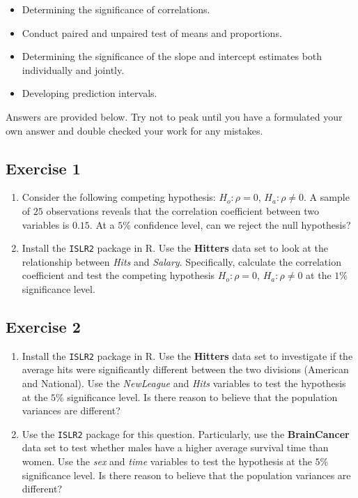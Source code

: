 \documentclass[
  letterpaper,
  DIV=11,
  numbers=noendperiod]{scrreprt}
\begin{document}
\begin{itemize}
\item
  Determining the significance of correlations.
\item
  Conduct paired and unpaired test of means and proportions.
\item
  Determining the significance of the slope and intercept estimates both
  individually and jointly.
\item
  Developing prediction intervals.
\end{itemize}

Answers are provided below. Try not to peak until you have a formulated
your own answer and double checked your work for any mistakes.

\hypertarget{exercise-1-26}{%
\subsection*{Exercise 1}\label{exercise-1-26}}

\begin{enumerate}
\def\labelenumi{\arabic{enumi}.}
\item
  Consider the following competing hypothesis: \(H_{o}: \rho=0\),
  \(H_{a}: \rho \neq 0\). A sample of \(25\) observations reveals that
  the correlation coefficient between two variables is \(0.15\). At a
  \(5\)\% confidence level, can we reject the null hypothesis?
\item
  Install the \texttt{ISLR2} package in R. Use the \textbf{Hitters} data
  set to look at the relationship between \emph{Hits} and \emph{Salary}.
  Specifically, calculate the correlation coefficient and test the
  competing hypothesis \(H_{o}: \rho=0\), \(H_{a}: \rho \neq 0\) at the
  \(1\)\% significance level.
\end{enumerate}

\hypertarget{exercise-2-26}{%
\subsection*{Exercise 2}\label{exercise-2-26}}

\begin{enumerate}
\def\labelenumi{\arabic{enumi}.}
\item
  Install the \texttt{ISLR2} package in R. Use the \textbf{Hitters} data
  set to investigate if the average hits were significantly different
  between the two divisions (American and National). Use the
  \emph{NewLeague} and \emph{Hits} variables to test the hypothesis at
  the \(5\)\% significance level. Is there reason to believe that the
  population variances are different?
\item
  Use the \texttt{ISLR2} package for this question. Particularly, use
  the \textbf{BrainCancer} data set to test whether males have a higher
  average survival time than women. Use the \emph{sex} and \emph{time}
  variables to test the hypothesis at the \(5\)\% significance level. Is
  there reason to believe that the population variances are different?
\end{enumerate}
\end{document}
